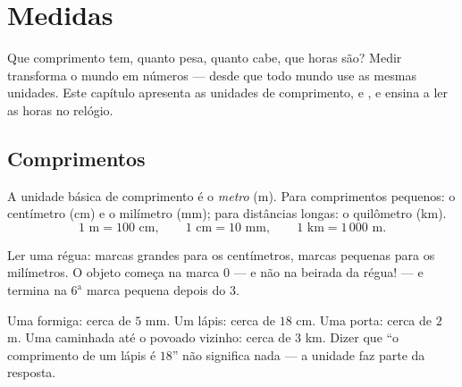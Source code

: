 \chapter{Medidas}\label{ch:g3:measure}

Que comprimento tem, quanto pesa, quanto cabe, que horas são? Medir
transforma o mundo em números --- desde que todo mundo use as mesmas
unidades. Este capítulo apresenta as unidades de comprimento,  e
, e ensina a ler as horas no relógio.

\section{Comprimentos}

\begin{definition}\label{def:g3:measure:length}
A unidade básica de comprimento é o \emph{metro} (m). Para
comprimentos pequenos: o centímetro (cm) e o milímetro (mm); para
distâncias longas: o quilômetro (km).
\[
1 \text{ m} = 100 \text{ cm}, \qquad
1 \text{ cm} = 10 \text{ mm}, \qquad
1 \text{ km} = 1\,000 \text{ m}.
\]
\end{definition}

\begin{omfigure}

{\small Ler uma régua: marcas grandes para os centímetros, marcas
pequenas para os milímetros. O objeto começa na marca $0$ --- e não
na beirada da régua! --- e termina na $6^{\text{a}}$ marca pequena
depois do $3$.}
\end{omfigure}

\begin{example}\label{ex:g3:measure:choose}
Uma formiga: cerca de $5$ mm. Um lápis: cerca de $18$ cm. Uma porta:
cerca de $2$ m. Uma caminhada até o povoado vizinho: cerca de $3$
km. Dizer que ``o comprimento de um lápis é $18$'' não significa
nada --- a unidade faz parte da resposta.
\end{example}

